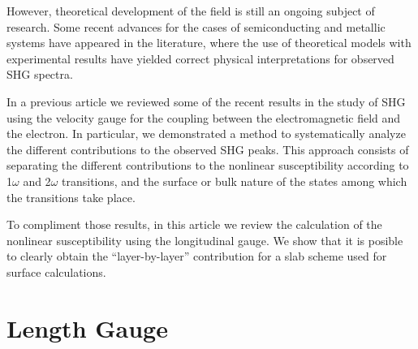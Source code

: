 \documentclass[floatfix,prb,aps,superscriptaddress,11pt,preprint,letterpaper]{revtex4}
\begin{document}
However, theoretical development of the field is still an ongoing 
subject of research. Some recent advances for the cases of semiconducting 
and metallic systems have appeared in the literature, where the use of 
theoretical models with experimental results have yielded correct 
physical interpretations for observed SHG spectra.
\cite{
downer_optical_2001,
mendoza_ab_2001,
lim_optical_2000,
gavrilenko_optical_2000,
mendoza_visible-infrared_1999,
mendoza_microscopic_1998,
mendozaPRB96,
mendoza_polarizable-bond_1997,
guyotPRB90} 

In a previous article\cite{mendoza_epioptics_2001} we reviewed some 
of the recent results in the study of SHG using the velocity gauge 
for the coupling between the electromagnetic field and the electron. 
In particular, we demonstrated a method to systematically analyze the 
different contributions to the observed SHG peaks.\cite{arzatePRB01} 
This approach consists of separating the different contributions to 
the nonlinear susceptibility according to 1$\omega$ and 2$\omega$ 
transitions, and the surface or bulk nature of the states among 
which the transitions take place. 

To compliment those results, in this article we review the calculation 
of the nonlinear susceptibility using the longitudinal gauge. We show 
that it is posible to clearly obtain the ``layer-by-layer'' contribution 
for a slab scheme used for surface calculations.

\section{Length Gauge}\label{longi}
\end{document}
